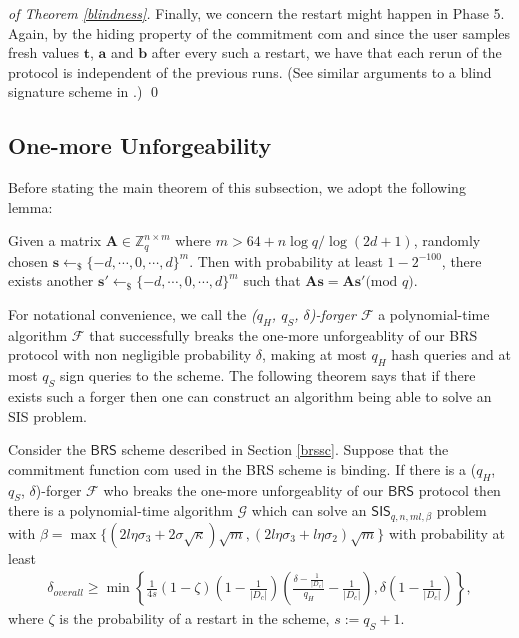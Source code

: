 \documentclass[runningheads]{llncs}
\begin{document}
\begin{proof}[of Theorem \ref{blindness}]
	Finally, we concern the restart might happen in Phase 5. Again, by the hiding property of the commitment \textsf{com} and since the user samples fresh values $\mathbf{t}$, $\mathbf{a}$ and $\mathbf{b}$ after every such a restart, we have that each rerun of the protocol is independent of the previous runs. (See similar arguments to a blind signature scheme in \cite{Ruc10}.) \qed
	
	
\end{proof}


\subsection{One-more Unforgeability}
Before stating the main theorem of this subsection, we adopt the following lemma:
\begin{lemma} \label{lem4}
	Given a matrix $\mathbf{A} \in \mathbb{Z}_q^{n \times m}$ where $m>64+n\log q/\log(2d+1)$, randomly chosen $\mathbf{s} \leftarrow_{\$} \{-d, \cdots, 0, \cdots, d\}^m$. Then with probability at least $1-2^{-100}$, there exists another $\mathbf{s}' \leftarrow_{\$} \{-d, \cdots, 0, \cdots, d\}^m$ such that $\mathbf{A}\mathbf{s}=\mathbf{A}\mathbf{s}' \text{(mod } q).$
\end{lemma}

For notational convenience, we call the \textit{($q_H$, $q_S$, $\delta$)-forger $\mathcal{F}$} a polynomial-time algorithm $\mathcal{F}$ that successfully breaks the one-more unforgeablity of our \textsf{BRS} protocol with non negligible probability $\delta$, making at most $q_H$ hash queries and at most $q_S$ sign queries to the scheme. The following theorem says that if there exists such a forger then one can construct an algorithm being able to solve an \textsf{SIS} problem.
\begin{theorem} \label{theo1} Consider the $\mathsf{BRS}$ scheme described in Section \ref{brssc}.
	Suppose that the commitment function  \textsf{com} used in the \textsf{BRS} scheme is binding. If there is a ($q_H$, $q_S$, $\delta$)-forger $\mathcal{F}$ who breaks the one-more unforgeablity of our $\mathsf{BRS}$ protocol then there is a polynomial-time algorithm $\mathcal{G}$ which can solve an $\mathsf{SIS}_{q,n,ml, \beta}$ problem with $\beta=\max\{(2l\eta\sigma_3+2\sigma\sqrt{\kappa})\sqrt{m}, (2l\eta\sigma_3+l\eta\sigma_2)\sqrt{m}\}$ with probability at least \begin{align*}
	\delta_{overall} \geq	\min \left\{ \frac{1}{4s}(1-\zeta)\left(1-\frac{1}{|D_c|}\right)\left(\frac{\delta-\frac{1}{|D_c|}}{q_H}-\frac{1}{|D_c|}\right), \delta\left(1-\frac{1}{|D_c|}\right) \right\},
	\end{align*} where $\zeta$ is the probability of a restart in the scheme, $s:=q_S+1$. 
\end{theorem}
\end{document}
